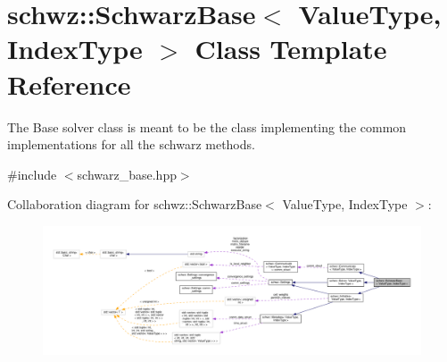 \hypertarget{classschwz_1_1SchwarzBase}{}\section{schwz\+:\+:Schwarz\+Base$<$ Value\+Type, Index\+Type $>$ Class Template Reference}
\label{classschwz_1_1SchwarzBase}


The Base solver class is meant to be the class implementing the common implementations for all the schwarz methods.  




{\ttfamily \#include $<$schwarz\+\_\+base.\+hpp$>$}



Collaboration diagram for schwz\+:\+:Schwarz\+Base$<$ Value\+Type, Index\+Type $>$\+:
\nopagebreak
\begin{figure}[H]
\begin{center}
\leavevmode
\includegraphics[width=350pt]{classschwz_1_1SchwarzBase__coll__graph}
\end{center}
\end{figure}

